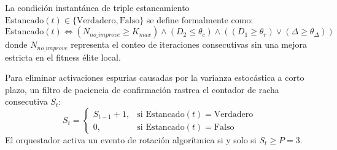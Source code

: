La condición instantánea de triple estancamiento $\text{Estancado}(t) \in \{\text{Verdadero}, \text{Falso}\}$ se define formalmente como:
\begin{equation}
\text{Estancado}(t) \iff \left( N_{no\_improve} \ge K_{max} \right) \land \left( D_2 \le \theta_c \right) \land \left( (D_1 \ge \theta_r) \lor (\Delta \ge \theta_\Delta) \right)
\label{eq:stagnant_condition}
\end{equation}
donde $N_{no\_improve}$ representa el conteo de iteraciones consecutivas sin una mejora estricta en el fitness élite local.

Para eliminar activaciones espurias causadas por la varianza estocástica a corto plazo, un filtro de paciencia de confirmación rastrea el contador de racha consecutiva $S_t$:
\begin{equation}
S_t = \begin{cases}
S_{t-1} + 1, & \text{si } \text{Estancado}(t) = \text{Verdadero} \\
0, & \text{si } \text{Estancado}(t) = \text{Falso}
\end{cases}
\label{eq:streak_counter}
\end{equation}
El orquestador activa un evento de rotación algorítmica si y solo si $S_t \ge P = 3$.